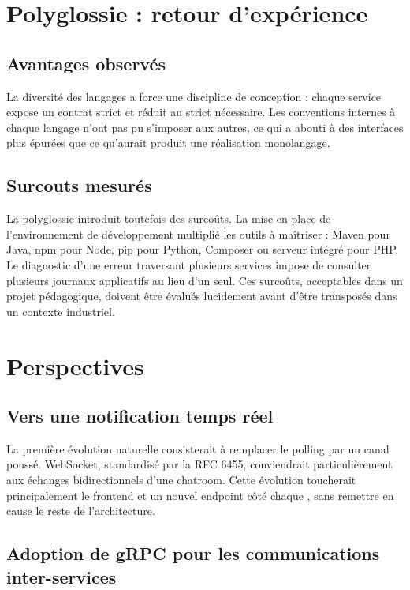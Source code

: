 \section{Polyglossie : retour d'expérience}

\subsection{Avantages observés}

La diversité des langages a force une discipline de conception : chaque service expose un contrat strict et réduit au strict nécessaire. Les conventions internes à chaque langage n'ont pas pu s'imposer aux autres, ce qui a abouti à des interfaces plus épurées que ce qu'aurait produit une réalisation monolangage.

\subsection{Surcouts mesurés}

La polyglossie introduit toutefois des surcoûts. La mise en place de l'environnement de développement multiplié les outils à maîtriser : Maven pour Java, npm pour Node, pip pour Python, Composer ou serveur intégré pour PHP. Le diagnostic d'une erreur traversant plusieurs services impose de consulter plusieurs journaux applicatifs au lieu d'un seul. Ces surcoûts, acceptables dans un projet pédagogique, doivent être évalués lucidement avant d'être transposés dans un contexte industriel.

\section{Perspectives}

\subsection{Vers une notification temps réel}

La première évolution naturelle consisterait à remplacer le polling par un canal poussé. WebSocket, standardisé par la RFC 6455, conviendrait particulièrement aux échanges bidirectionnels d'une chatroom. Cette évolution toucherait principalement le frontend et un nouvel endpoint côté chaque , sans remettre en cause le reste de l'architecture.

\subsection{Adoption de gRPC pour les communications inter-services}

